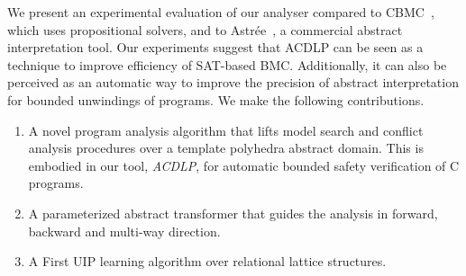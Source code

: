 We present an experimental evaluation of our analyser compared 
to CBMC~\cite{cbmc.tacas:2004}, which uses propositional solvers, and to 
Astr{\'e}e~\cite{DBLP:conf/pldi/BlanchetCCFMMMR03}, a commercial abstract 
interpretation tool.  Our experiments suggest that ACDLP can be seen as a 
technique to improve efficiency of SAT-based BMC. Additionally, it can 
also be perceived as an automatic way to improve the precision of abstract 
interpretation for bounded unwindings of programs.  We make the following 
contributions.
%
\begin{enumerate}
\item A novel program analysis algorithm that lifts model search and conflict
analysis procedures over a template polyhedra abstract domain. This is 
embodied in our tool, \emph{ACDLP}, for automatic bounded 
safety verification of C programs.
\item A parameterized abstract transformer that guides the analysis in forward,
backward and multi-way direction.
\item A First UIP learning algorithm over relational lattice structures. 
\end{enumerate}
%






